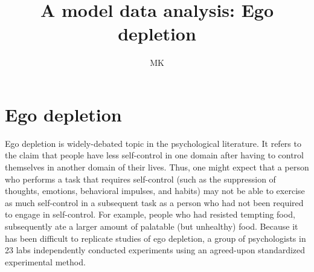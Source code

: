 \documentclass{article}\usepackage[]{graphicx}\usepackage[]{color}
\title{A model data analysis: Ego depletion}
\author{MK}
\begin{document}
\maketitle

\dosecttoc
\tableofcontents 

\pagebreak





\section{Ego depletion}

Ego depletion is widely-debated topic in the psychological literature. It refers to the claim that people have less self-control in one domain after having to control themselves in another domain of their lives. Thus, one might expect that a person who performs a task that requires self-control (such as the suppression of thoughts, emotions, behavioral impulses, and habits) may not be able to exercise as much self-control in a subsequent task as a person who had not been required to engage in self-control. For example, people who had resisted tempting food, subsequently ate a larger amount of palatable (but unhealthy) food. Because it has been difficult to replicate studies of ego depletion, a group of psychologists in 23 labs independently conducted experiments using an agreed-upon standardized experimental method.
\end{document}
